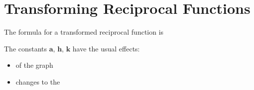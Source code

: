 \section{Transforming Reciprocal Functions}

The formula for a transformed reciprocal function is 
\vspace{-0.5\onelineskip}

\vspace{-0.5\onelineskip}

The constants $\bm{a}$, $\bm{h}$, $\bm{k}$ have the usual effects:
\begin{itemize}[nosep]
    \item {} of the graph
    \item changes to the 
\end{itemize}

